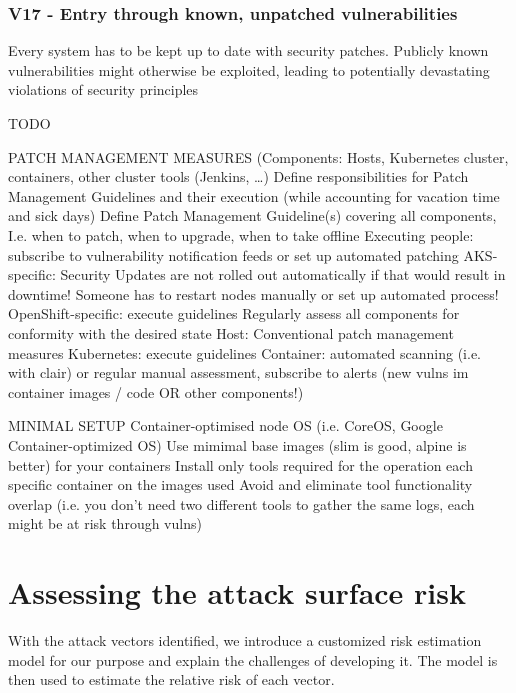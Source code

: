 \subsection{V17 - Entry through known, unpatched vulnerabilities}
Every system has to be kept up to date with  security patches. Publicly known vulnerabilities might otherwise be exploited, leading to potentially devastating violations of security principles

TODO

PATCH MANAGEMENT MEASURES
(Components: Hosts, Kubernetes cluster, containers, other cluster tools (Jenkins, …)
	Define responsibilities for Patch Management Guidelines and their execution (while accounting for vacation time and sick days)
	Define Patch Management Guideline(s) covering all components, I.e. when to patch, when to upgrade, when to take offline
	Executing people: subscribe to vulnerability notification feeds or set up automated patching
	AKS-specific: Security Updates are not rolled out automatically if that would result in downtime! Someone has to restart nodes manually or set up automated process!
	OpenShift-specific: execute guidelines
	Regularly assess all components for conformity with the desired state
	Host: Conventional patch management measures
	Kubernetes: execute guidelines
	Container: automated scanning (i.e. with clair) or regular manual assessment, subscribe to alerts (new vulns im container images / code OR other components!)
	
MINIMAL SETUP	
	Container-optimised node OS (i.e. CoreOS, Google Container-optimized OS)
	Use mimimal base images (slim is good, alpine is better) for your containers
	Install only tools required for the operation each specific container on the images used
	Avoid and eliminate tool functionality overlap (i.e. you don’t need two different tools to gather the same logs, each might be at risk through vulns)


\chapter{Assessing the attack surface risk}

With the attack vectors identified, we introduce a customized risk estimation model for our purpose and explain the challenges of developing it. The model is then used to estimate the relative risk of each vector.

